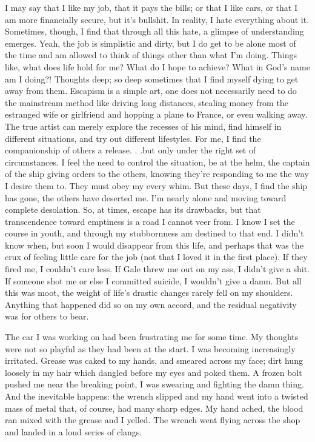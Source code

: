 I may say that I like my job, that it pays the bills; or that I like
cars, or that I am more financially secure, but it's bullshit. In
reality, I hate everything about it. Sometimes, though, I find that
through all this hate, a glimpse of understanding emerges. Yeah, the job
is simplistic and dirty, but I do get to be alone most of the time and
am allowed to think of things other than what I'm doing. Things like,
what does life hold for me? What do I hope to achieve? What in God's
name am I doing?! Thoughts deep; so deep sometimes that I find myself
dying to get away from them. Escapism is a simple art, one does not
necessarily need to do the mainstream method like driving long
distances, stealing money from the estranged wife or girlfriend and
hopping a plane to France, or even walking away. The true artist can
merely explore the recesses of his mind, find himself in different
situations, and try out different lifestyles. For me, I find the
companionship of others a release. . .but only under the right set of
circumstances. I feel the need to control the situation, be at the helm,
the captain of the ship giving orders to the others, knowing they're
responding to me the way I desire them to. They must obey my every whim.
But these days, I find the ship has gone, the others have deserted me.
I'm nearly alone and moving toward complete desolation. So, at times,
escape has its drawbacks, but that transcendence toward emptiness is a
road I cannot veer from. I know I set the course in youth, and through
my stubbornness am destined to that end. I didn't know when, but soon I
would disappear from this life, and perhaps that was the crux of feeling
little care for the job (not that I loved it in the first place). If
they fired me, I couldn't care less. If Gale threw me out on my ass, I
didn't give a shit. If someone shot me or else I committed suicide, I
wouldn't give a damn. But all this was moot, the weight of life's
drastic changes rarely fell on my shoulders. Anything that happened did
so on my own accord, and the residual negativity was for others to bear.

The car I was working on had been frustrating me for some time. My
thoughts were not so playful as they had been at the start. I was
becoming increasingly irritated. Grease was caked to my hands, and
smeared across my face; dirt hung loosely in my hair which dangled
before my eyes and poked them. A frozen bolt pushed me near the breaking
point, I was swearing and fighting the damn thing. And the inevitable
happens: the wrench slipped and my hand went into a twisted mass of
metal that, of course, had many sharp edges. My hand ached, the blood
ran mixed with the grease and I yelled. The wrench went flying across
the shop and landed in a loud series of clangs.

